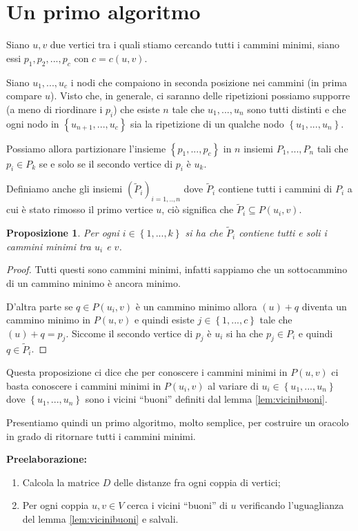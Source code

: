 \documentclass[a4paper,10pt]{amsbook}
\newcounter{counter1}
\theoremstyle{plain}
\newtheorem{mypro}[counter1]{Proposizione}
\theoremstyle{definition}
\theoremstyle{remark}
\newcommand{\set}[1]{\left\{#1\right\}}
\newcommand{\pa}[1]{\left(#1\right)}
\begin{document}
\section{Un primo algoritmo}

Siano $u,v$ due vertici tra i quali stiamo cercando tutti i cammini
minimi, siano essi $p_1,p_2,...,p_c$ con $c = c(u,v)$.

Siano $u_1,..., u_c$ i nodi che compaiono in seconda posizione nei
cammini (in prima compare $u$). Visto che, in generale, ci saranno
delle ripetizioni possiamo supporre (a meno di riordinare i $p_i$) che
esiste $n$ tale che $u_1,...,u_n$ sono tutti distinti e che ogni nodo
in $\set{ u_{n+1},..., u_c}$ sia la ripetizione di un qualche nodo
$\set{ u_1,..., u_n}$.

Possiamo allora partizionare l'insieme $\set{p_1,... ,p_c}$ in $n$
insiemi $P_1, ..., P_n$ tali che $p_i \in P_k$ se e solo se il secondo
vertice di $p_i$ \`e $u_k$.

Definiamo anche gli insiemi $\pa{ \tilde P_i} _{i=1,..,n}$ dove
$\tilde P_i$ contiene tutti i cammini di $P_i$ a cui \`e stato rimosso
il primo vertice $u$, ci\`o significa che $\tilde P _i \subseteq P\pa{
  u_i, v}$.

\begin{mypro}
  Per ogni $i \in \set{ 1,...,k}$ si ha che $\tilde P _i$ contiene
  tutti e soli i cammini minimi tra $u_i$ e $v$.
\end{mypro}
\begin{proof}
  Tutti questi sono cammini minimi, infatti sappiamo che un
  sottocammino di un cammino minimo \`e ancora minimo.

  D'altra parte se $q \in P(u_i,v)$ \`e un cammino minimo allora $(u)
  + q$ diventa un cammino minimo in $P(u,v)$ e quindi esiste $j \in
  \set{ 1,...,c}$ tale che $(u) +q = p_j$. Siccome il secondo vertice
  di $p_j$ \`e $u_i$ si ha che $p_j \in P_i$ e quindi $q \in \tilde P
  _i$.
\end{proof}

Questa proposizione ci dice che per conoscere i cammini minimi in
$P(u,v)$ ci basta conoscere i cammini minimi in $P(u_i,v)$ al variare
di $u_i \in \set{ u_1,..., u_n}$ dove $\set{ u_1,..., u_n}$ sono i
vicini ``buoni'' definiti dal lemma \ref{lem:vicinibuoni}.

Presentiamo quindi un primo algoritmo, molto semplice, per costruire
un oracolo in grado di ritornare tutti i cammini minimi.

\textbf{Preelaborazione:}
\begin{enumerate}
\item Calcola la matrice $D$ delle distanze fra ogni coppia di vertici;
\item Per ogni coppia $u,v\in V$ cerca i vicini ``buoni'' di $u$
  verificando l'uguaglianza del lemma \ref{lem:vicinibuoni} e salvali.
\end{enumerate}
\end{document}
